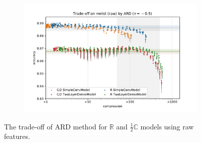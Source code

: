 \documentclass[a4paper,10pt]{article}
\newcommand{\real}{\mathbb{R}}
\newcommand{\cplx}{\mathbb{C}}
\begin{document}
\begin{figure}[b]
\begin{subfigure}[b]{0.5\textwidth}
  \end{subfigure}%
  \begin{subfigure}[b]{0.5\textwidth}
    \centering
    \includegraphics[width=\linewidth]{figure__mnist-like__trade-off/appendix__cmp__ARD__mnist__raw__-0.5.pdf}
  \end{subfigure}
  \caption{%
    The trade-off of ARD method for $\real$ and $\tfrac12\cplx$ models using raw features.
  }
  \label{fig:appendix__cmp__mnist-like__trade-off__ARD__raw}
\end{figure}
\end{document}
